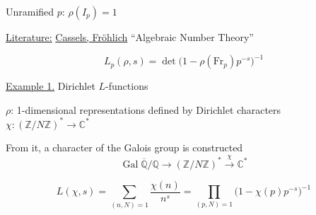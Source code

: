 Unramified $p$: $\rho(I_p)=1$

\underline{Literature:} \underline{Cassels, Fr\"ohlich} ``Algebraic Number Theory''

\begin{equation*}
L_p(\rho,s)=\det\bigl(1-\rho(\mathrm{Fr}_p)p^{-s}\bigr)^{-1}
\end{equation*}

\underline{Example 1.} Dirichlet $L$-functions

$\rho$: 1-dimensional representations defined by Dirichlet characters
$\chi:(\mathbb{Z}/N\mathbb{Z})^*\longrightarrow\mathbb{C}^*$

From it, a character of the Galois group is constructed
\begin{equation*}
\operatorname{Gal}\overline{\mathbb{Q}}/\mathbb{Q}
\longrightarrow (\mathbb{Z}/N\mathbb{Z})^*
\overset{\chi}{\longrightarrow}\mathbb{C}^*
\end{equation*}

\begin{equation*}
L(\chi,s)=\sum_{(n,N)=1}\frac{\chi(n)}{n^s}
=\prod_{(p,N)=1}\bigl(1-\chi(p)p^{-s}\bigr)^{-1}
\end{equation*}



